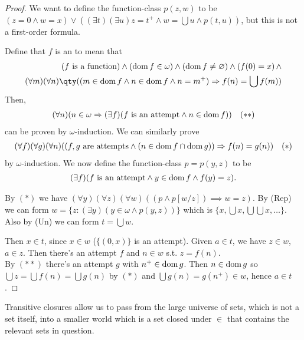 \begin{proof}
    We want to define the function-class $p(z,w)$ to be $(z = 0 \wedge w = x) \vee ((\exists t)(\exists u) z = t^+ \wedge w = \bigcup u \wedge p(t,u))$, but this is not a first-order formula.

    Define that $f$ is an  to mean that
    \begin{align*}
        (f \text{ is a function}) \wedge (\dom f \in \omega) \wedge (\dom f \neq \varnothing) \wedge (f(0) = x)\, \wedge \\
        (\forall m)(\forall n)\qty((m \in \dom f \wedge n \in \dom f \wedge n = m^+) \implies f(n) = \bigcup f(m))
    \end{align*}
    Then,
    \begin{align*}
        (\forall n)(n \in \omega \Rightarrow (\exists f)(f \text{ is an attempt} \wedge n \in \operatorname{dom} f)) \quad (\ast\ast)
    \end{align*}
    can be proven by $\omega$-induction.
    We can similarly prove
    \begin{align*}
        (\forall f)(\forall g)(\forall n)((f, g \text{ are attempts} \wedge (n \in \operatorname{dom} f \cap \operatorname{dom} g)) \Rightarrow f(n) = g(n)) \quad (\ast)
    \end{align*}
    by $\omega$-induction.
    We now define the function-class $p = p(y, z)$ to be
    \begin{align*}
        (\exists f)(f \text{ is an attempt} \wedge y \in \operatorname{dom} f \wedge f(y) = z).
    \end{align*}

    By $(\ast)$ we have $(\forall y)(\forall z)(\forall w)((p \wedge p[w/z]) \implies w = z)$.
    By (Rep) we can form $w = \{z : (\exists y)(y \in \omega \wedge p(y, z))\}$ which is $\{x, \bigcup x, \bigcup \bigcup x, \dots\}$.
    Also by (Un) we can form $t = \bigcup w$.

    Then $x \in t$, since $x \in w$ ($\{(0, x)\}$ is an attempt).
    Given $a \in t$, we have $z \in w$, $a \in z$.
    Then there's an attempt $f$ and $n \in w$ s.t. $z = f(n)$. \\
    By $(\ast\ast)$ there's an attempt $g$ with $n^+ \in \operatorname{dom} g$.
    Then $n \in \operatorname{dom} g$ so $\bigcup z = \bigcup f(n) = \bigcup g(n)$ by $(\ast)$ and $\bigcup g(n) = g(n^+) \in w$, hence $a \in t$.
\end{proof}

Transitive closures allow us to pass from the large universe of sets, which is not a set itself, into a smaller world which is a set closed under $\in$ that contains the relevant sets in question.

